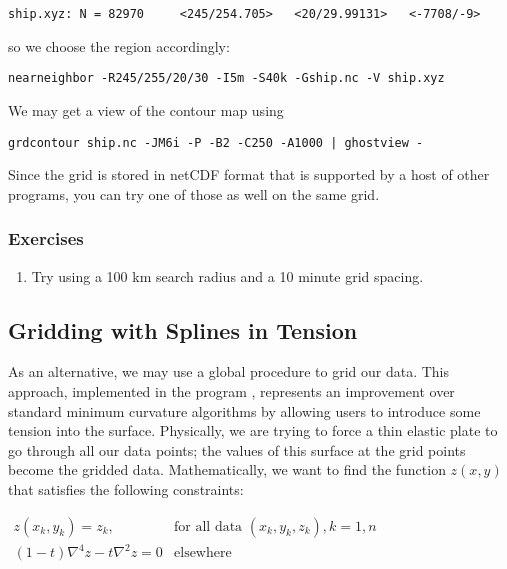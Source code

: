\documentclass[11pt]{report}
\begin{document}
{\small\begin{verbatim}
ship.xyz: N = 82970     <245/254.705>   <20/29.99131>   <-7708/-9>
\end{verbatim}
}

so we choose the region accordingly:

{\small\begin{verbatim}
nearneighbor -R245/255/20/30 -I5m -S40k -Gship.nc -V ship.xyz
\end{verbatim}
}

We may get a view of the contour map using

{\small\begin{verbatim} 
grdcontour ship.nc -JM6i -P -B2 -C250 -A1000 | ghostview -
\end{verbatim}
}

Since the grid  is stored in netCDF format that is supported by a host of other programs,
you can try one of those as well on the same grid.

\subsubsection{Exercises}

\begin{enumerate}

\item Try using a 100 km search radius and a 10 minute grid spacing.

\end{enumerate}

\subsection{Gridding with Splines in Tension}

As an alternative, we may use a global procedure to grid our data.
This approach, implemented in the program , represents
an improvement over standard minimum curvature algorithms by allowing
users to introduce some tension into the surface.
Physically, we are trying to force a thin elastic plate to go through
all our data points; the values of this surface at the grid points
become the gridded data.  Mathematically, we want to find the function
$z(x, y)$ that satisfies the following constraints: \\

\( \begin{array}{ll}
z(x_k, y_k) = z_k,      &       \mbox{for all data $(x_k, y_k, z_k), k =1,n$} \\
(1-t)\nabla^4 z -  t \nabla^2 z = 0     &       \mbox{elsewhere}
\end{array} \) \\
\end{document}
